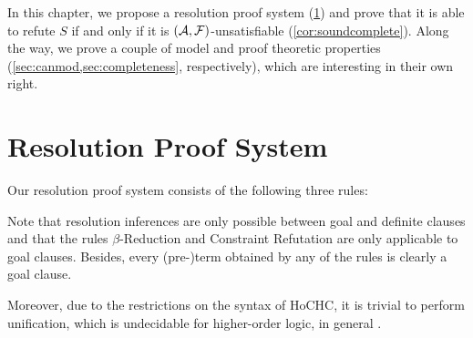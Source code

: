 \documentclass[a4paper,twoside,notitlepage,openright,11pt]{report}
\begin{document}
In this chapter, we propose a resolution proof system (\cref{sec:proofsystem}) and prove that it is able to refute $S$ if and only if it is $(\mathcal A,\mathcal F)$-unsatisfiable (\cref{cor:soundcomplete}). Along the way, we prove a couple of model and proof theoretic properties (\cref{sec:canmod,sec:completeness}, respectively), which are interesting in their own right.

\section{Resolution Proof System}
\label{sec:proofsystem}
Our resolution proof system consists of the following three rules:

\medskip

\medskip

\bigskip

Note that resolution inferences are only possible between goal and definite clauses and that the rules $\beta$-Reduction and Constraint Refutation are only applicable to goal clauses. Besides, every (pre-)term obtained by any of the rules is clearly a goal clause.

Moreover, due to the restrictions on the syntax of HoCHC, %
it is trivial to perform unification,  which is undecidable for higher-order logic, in general \cite{L72,H73,G81}. %
\end{document}
